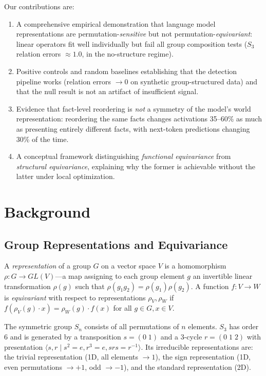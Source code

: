 \documentclass[10pt, letterpaper]{article}
\begin{document}
Our contributions are:
\begin{enumerate}[itemsep=2pt]
    \item A comprehensive empirical demonstration that language model representations are permutation-\emph{sensitive} but not permutation-\emph{equivariant}: linear operators fit well individually but fail all group composition tests ($S_3$ relation errors $\approx 1.0$, in the no-structure regime).
    \item Positive controls and random baselines establishing that the detection pipeline works (relation errors $\to 0$ on synthetic group-structured data) and that the null result is not an artifact of insufficient signal.
    \item Evidence that fact-level reordering is \emph{not} a symmetry of the model's world representation: reordering the same facts changes activations 35--60\% as much as presenting entirely different facts, with next-token predictions changing 30\% of the time.
    \item A conceptual framework distinguishing \emph{functional equivariance} from \emph{structural equivariance}, explaining why the former is achievable without the latter under local optimization.
\end{enumerate}

\section{Background}
\label{sec:background}

\subsection{Group Representations and Equivariance}

A \emph{representation} of a group $G$ on a vector space $V$ is a homomorphism $\rho: G \to GL(V)$---a map assigning to each group element $g$ an invertible linear transformation $\rho(g)$ such that $\rho(g_1 g_2) = \rho(g_1)\rho(g_2)$. A function $f: V \to W$ is \emph{equivariant} with respect to representations $\rho_V, \rho_W$ if $f(\rho_V(g) \cdot x) = \rho_W(g) \cdot f(x)$ for all $g \in G, x \in V$.

The symmetric group $S_n$ consists of all permutations of $n$ elements. $S_3$ has order 6 and is generated by a transposition $s = (0\;1)$ and a 3-cycle $r = (0\;1\;2)$ with presentation $\langle s, r \mid s^2 = e, r^3 = e, srs = r^{-1} \rangle$. Its irreducible representations are: the trivial representation (1D, all elements $\to 1$), the sign representation (1D, even permutations $\to +1$, odd $\to -1$), and the standard representation (2D).
\end{document}
